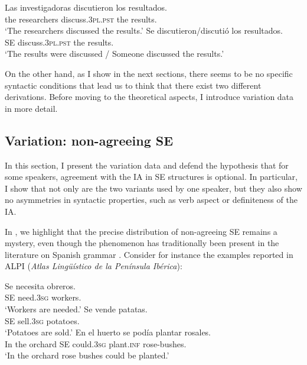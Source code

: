 \documentclass[output=paper,colorlinks,citecolor=brown]{langscibook}
\begin{document}
\ea \label{ex:05:SEactpas}
    \ea \label{ex:05:SEactpasa}
        \gll Las investigadoras discutieron los resultados. \\
            the researchers discuss.\textsc{3pl.pst} the results.\\
        \glt `The researchers discussed the results.'
    \ex \label{ex:05:SEactpasb}
        \gll Se discutieron/discutió los resultados.  \\
            SE discuss.\textsc{3pl.pst} the results. \\
        \glt `The results were discussed / Someone discussed the results.'
\z \z

On the other hand, as I show in the next sections, there seems to be no specific syntactic conditions that lead us to think that there exist two different derivations. Before moving to the theoretical aspects, I introduce variation data in more detail.

\subsection{Variation: non-agreeing SE}

In this section, I present the variation data and defend the hypothesis that for some speakers, agreement with the IA in SE structures is optional. In particular, I show that not only are
the two variants used by one speaker, but they also show no asymmetries in syntactic properties, such as verb aspect or definiteness of the IA.

In \citet{Arias_Fernandez2020}, we highlight that the precise distribution of non-agreeing SE remains a mystery, even though the phenomenon has traditionally been present in the literature on Spanish grammar \citep[see][]{SanchezLopez2002}. Consider for instance the examples reported in ALPI (\textit{Atlas Lingüístico de la Península Ibérica}):

\newpage
\ea\label{ex:05:ALPI} \citet[data from ALPI;][23]{DeBenito2010}
    \ea\label{ex:05:ALPIa}
        \gll Se necesita obreros. \\
        SE need.\textsc{3sg} workers. \\
        \glt ‘Workers are needed.’
    \ex \label{ex:05:ALPIb}
        \gll Se vende patatas. \\
         SE sell.\textsc{3sg} potatoes. \\
        \glt ‘Potatoes are sold.’
    \ex \label{ex:05:ALPIc}
        \gll En el huerto se podía plantar rosales. \\
       In the orchard SE could.\textsc{3sg} plant.\textsc{inf} rose-bushes. \\
        \glt ‘In the orchard rose bushes could be planted.’
\z \z
\end{document}
